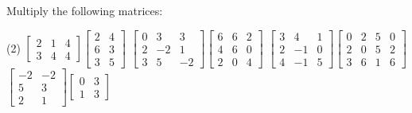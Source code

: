 \begin{exercise}
\pagebreak[2]
Multiply the following matrices:
\begin{tasks}(2)
\task
$\begin{bmatrix}
2 & 1 & 4 \\
3 & 4 & 4
\end{bmatrix}
\begin{bmatrix}
2 & 4 \\
6 & 3 \\
3 & 5
\end{bmatrix}$
\task
$\begin{bmatrix}
0 & 3 & 3 \\
2 & -2 & 1 \\
3 & 5 & -2
\end{bmatrix}
\begin{bmatrix}
6 & 6 & 2 \\
4 & 6 & 0 \\
2 & 0 & 4
\end{bmatrix}$
\task
$\begin{bmatrix}
3 & 4 & 1 \\
2 & -1 & 0 \\
4 & -1 & 5
\end{bmatrix}
\begin{bmatrix}
0 & 2 & 5 & 0 \\
2 & 0 & 5 & 2 \\
3 & 6 & 1 & 6
\end{bmatrix}$
\task
$\begin{bmatrix}
-2 & -2 \\
5 & 3 \\
2 & 1
\end{bmatrix}
\begin{bmatrix}
0 & 3 \\
1 & 3
\end{bmatrix}$
\end{tasks}
\end{exercise}

